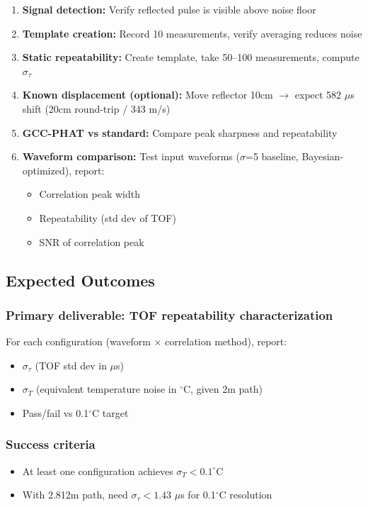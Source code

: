\documentclass[11pt]{article}
\begin{document}
\begin{enumerate}
    \item \textbf{Signal detection:} Verify reflected pulse is visible above noise floor
    \item \textbf{Template creation:} Record 10 measurements, verify averaging reduces noise
    \item \textbf{Static repeatability:} Create template, take 50--100 measurements, compute $\sigma_\tau$
    \item \textbf{Known displacement (optional):} Move reflector 10cm $\rightarrow$ expect 582 $\mu$s shift (20cm round-trip / 343 m/s)
    \item \textbf{GCC-PHAT vs standard:} Compare peak sharpness and repeatability
    \item \textbf{Waveform comparison:} Test input waveforms ($\sigma$=5 baseline, Bayesian-optimized), report:
    \begin{itemize}
        \item Correlation peak width
        \item Repeatability (std dev of TOF)
        \item SNR of correlation peak
    \end{itemize}
\end{enumerate}

\subsection{Expected Outcomes}

\subsubsection{Primary deliverable: TOF repeatability characterization}

For each configuration (waveform $\times$ correlation method), report:
\begin{itemize}
    \item $\sigma_\tau$ (TOF std dev in $\mu$s)
    \item $\sigma_T$ (equivalent temperature noise in $^\circ$C, given 2m path)
    \item Pass/fail vs 0.1$^\circ$C target
\end{itemize}

\subsubsection{Success criteria}
\begin{itemize}
    \item At least one configuration achieves $\sigma_T < 0.1^\circ$C
    \item With 2.812m path, need $\sigma_\tau < 1.43$ $\mu$s for 0.1$^\circ$C resolution
\end{itemize}
\end{document}
